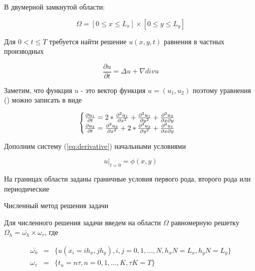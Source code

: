 \documentclass[12pt,a4paper]{scrartcl}
\begin{document}
\normalsize
В двумерной замкнутой области:

\begin{equation}
    \Omega = [0 \leq x \leq L_x] \times [0 \leq y \leq L_y]
\end{equation}

Для $0 < t \leq T$ требуется найти решение $u(x,y,t)$ равнения в частных производных

\begin{equation}
    \label{eq:derivative}
    \frac{\partial u}{\partial t} = \Delta u + \nabla div u
\end{equation}

Заметим, что функция $u$ - это вектор функция $u=(u_1, u_2)$ поэтому уравнения ()
можно записать в виде

\begin{equation}
    \begin{cases} 
    \label{eq:decompose}
        \frac{\partial{u_1}}{\partial t} = 2 * \pdv[2]{u_1}{x} + \pdv[2]{u_1}{y} + \pdv{u_2}{x}{y} \\ 
        \frac{\partial{u_2}}{\partial t} = \pdv[2]{u_2}{x} + 2 * \pdv[2]{u_2}{y} + \pdv{u_1}{x}{y} \\ 
    \end{cases}
\end{equation}



Дополним систему (\ref{eq:derivative}) начальными условиями

\begin{equation}
    u|_{t = 0} = \phi(x, y)
\end{equation}

На границах области заданы граничные условия первого рода, второго рода или периодические
\newpage

\Large
Численный метод решения задачи


\normalsize
Для численного решения задачи введем на области $\Omega$ равномерную решетку
$\Omega_h = \bar{\omega_h} \times \omega_{\tau}$, где 

\begin{equation}
\begin{array}{lcl}
    \bar{\omega_{h}} & = & \{u(x_i = ih_x, jh_y),i,j = 0,1,...,N, h_xN = L_x, h_y N = L_y\} \\
    \omega_{\tau} & = & \{t_n = n\tau, n = 0,1,...,K, \tau K = T\} \\
\end{array}
\end{equation}
\end{document}
